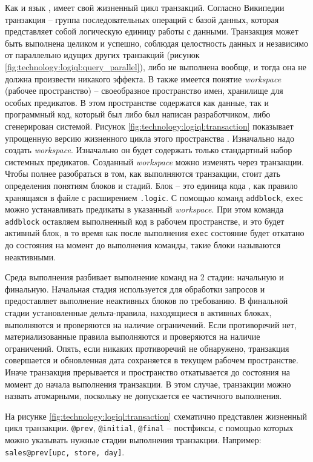 Как и язык \sql, \logiql имеет свой жизненный цикл транзакций. Согласно Википедии \cite{transaction_definition} транзакция – группа последовательных операций с базой данных, которая представляет собой логическую единицу работы с данными. Транзакция может быть выполнена целиком и успешно, соблюдая целостность данных и независимо от параллельно идущих других транзакций (рисунок \ref{fig:technology:logiql:query_parallel}), либо не выполнена вообще, и тогда она не должна произвести никакого эффекта.
В \logiql также имеется понятие \emph{workspace} (рабочее пространство) – своеобразное пространство имен, хранилище для особых предикатов. В этом пространстве содержатся как данные, так и программный код, который был либо был написан разработчиком, либо сгенерирован системой. Рисунок \ref{fig:technology:logiql:transaction} показывает упрощенную версию жизненного цикла этого пространства \cite{query_language_for_smart_db}.
Изначально надо создать \emph{workspace}. Изначально он будет содержать только стандартный набор системных предикатов. Созданный \emph{workspace} можно изменять через транзакции.
Чтобы полнее разобраться в том, как выполняются транзакции, стоит дать определения понятиям блоков и стадий. Блок – это единица кода \logiql, как правило хранящаяся в файле с расширением \lstinline{.logic}. С помощью команд \lstinline{addblock}, \lstinline{exec} можно устанавливать предикаты в указанный \emph{workspace}. При этом команда \lstinline{addblock} оставляем выполненный код в рабочем пространстве, и это будет активный блок, в то время как после выполнения \lstinline{exec} состояние будет откатано до состояния на момент до выполнения команды, такие блоки называются неактивными.

Среда выполнения \logiql разбивает выполнение команд на 2 стадии: начальную и финальную. Начальная стадия используется для обработки запросов и предоставляет выполнение неактивных блоков по требованию. В финальной стадии установленные дельта-правила, находящиеся в активных блоках, выполняются и проверяются на наличие ограничений. Если противоречий нет, материализованные правила выполняются и проверяются на наличие ограничений. Опять, если никаких противоречий не обнаружено, транзакция совершается и обновленная дата сохраняется в текущем рабочем пространстве. Иначе транзакция прерывается и пространство откатывается до состояния на момент до начала выполнения транзакции. В этом случае, транзакции можно назвать атомарными, поскольку не допускается ее частичного выполнения.

На рисунке \ref{fig:technology:logiql:transaction} схематично представлен жизненный цикл транзакции. \lstinline{@prev}, \lstinline{@initial}, \lstinline{@final} – постфиксы, с помощью которых можно
указывать нужные стадии выполнения транзакции. Например:
\lstinline{sales@prev[upc, store, day]}.

